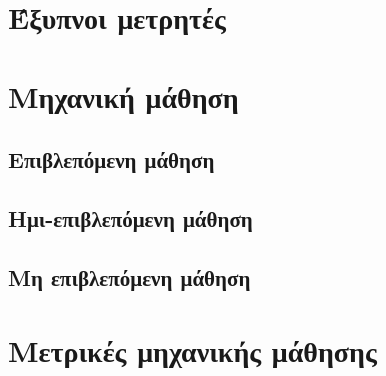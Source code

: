 \section{Έξυπνοι μετρητές}
\section{Μηχανική μάθηση}
\subsection{Επιβλεπόμενη μάθηση}
\subsection{Ημι-επιβλεπόμενη μάθηση}
\subsection{Μη επιβλεπόμενη μάθηση}
\section{Μετρικές μηχανικής μάθησης}